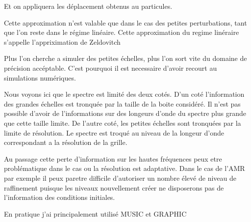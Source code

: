 Et on appliquera les déplacement obtenus au particules.

Cette approximation n'est valable que dans le cas des petites perturbations, tant que l'on reste dans le régime linéaire.
Cette approximation du regime linéraire s'appelle l'appriximation de Zeldovitch %

Plus l'on cherche a simuler des petites échelles, plus l'on sort vite du domaine de précision accéptable.
C'est pourquoi il est necessaire d'avoir recourt au simulations numériques.

Nous voyons ici que le spectre est limité des deux cotés.
D'un coté l'information des grandes échelles est tronquée par la taille de la boite considéré.
Il n'est pas possible d'avoir de l'informations sur des longeurs d'onde du spectre plus grande que cette taille limite.
De l'autre coté, les petites échelles sont tronquées par la limite de résolution.
Le spectre est troqué au niveau de la longeur d'onde correspondant a la résolution de la grille.

Au passage cette perte d'information sur les hautes fréquences peux etre problématique dans le cas ou la résolution est adaptative.
Dans le cas de l'AMR par exemple il peux paretre difficile d'autoriser un nombre élevé de niveau de raffinement puisque les niveaux nouvellement créer ne disposerons pas de l'information des conditions initiales.

En pratique j'ai principalement utilisé MUSIC et GRAPHIC %






%
%

%
%





